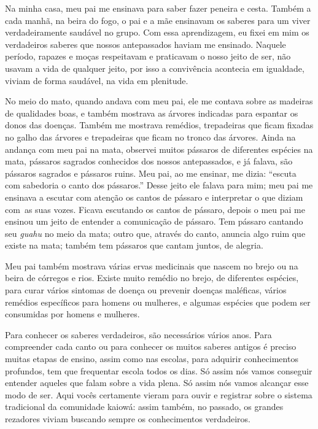 Na minha casa, meu pai me ensinava para saber fazer peneira e cesta.
Também a cada manhã, na beira do fogo, o pai e a mãe ensinavam os
saberes para um viver verdadeiramente saudável no grupo. Com essa
aprendizagem, eu fixei em mim os verdadeiros saberes que nossos
antepassados haviam me ensinado. Naquele período, rapazes e moças
respeitavam e praticavam o nosso jeito de ser, não usavam a vida de
qualquer jeito, por isso a convivência acontecia em igualdade, viviam de
forma saudável, na vida em plenitude.

No meio do mato, quando andava com meu pai, ele me contava sobre as
madeiras de qualidades boas, e também mostrava as árvores indicadas para
espantar os donos das doenças. Também me mostrava remédios, trepadeiras
que ficam fixadas no galho das árvores e trepadeiras que ficam no tronco
das árvores. Ainda na andança com meu pai na mata, observei muitos
pássaros de diferentes espécies na mata, pássaros sagrados conhecidos
dos nossos antepassados, e já falava, são pássaros sagrados e pássaros
ruins. Meu pai, ao me ensinar, me dizia: ``escuta com sabedoria o canto
dos pássaros.'' Desse jeito ele falava para mim; meu pai me ensinava a
escutar com atenção os cantos de pássaro e interpretar o que diziam com~as suas vozes. Ficava escutando os cantos de pássaro, depois o meu pai
me ensinou um jeito de entender a comunicação de pássaro. Tem pássaro
cantando seu \emph{guahu} no meio da mata; outro que, através do canto,
anuncia algo ruim que existe na mata; também tem pássaros que cantam
juntos, de alegria.

Meu pai também mostrava várias ervas medicinais que nascem no brejo ou
na beira de córregos e rios. Existe muito remédio no brejo, de
diferentes espécies, para curar vários sintomas de doença ou prevenir
doenças maléficas, vários remédios específicos para homens ou mulheres,
e algumas espécies que podem ser consumidas por homens e mulheres.

Para conhecer os saberes verdadeiros, são necessários vários anos. Para
compreender cada canto ou para conhecer os muitos saberes antigos é
preciso muitas etapas de ensino, assim como nas escolas, para adquirir
conhecimentos profundos, tem que frequentar escola todos os dias. Só
assim nós vamos conseguir entender aqueles que falam sobre a vida plena.
Só assim nós vamos alcançar esse modo de ser. Aqui vocês certamente
vieram para ouvir e registrar sobre o sistema tradicional da comunidade
kaiowá: assim também, no passado, os grandes rezadores viviam buscando
sempre os conhecimentos verdadeiros.

